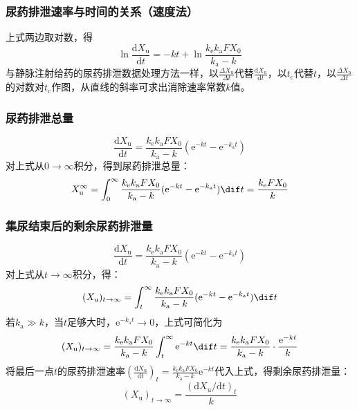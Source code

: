 \documentclass[dvipsnames, svgnames, x11names]{beamer}
\begin{document}
\begin{frame}
    \frametitle{尿药排泄速率与时间的关系（速度法）}
    上式两边取对数，得
    \[
        \ln \frac{\mathrm{d}X_\mathrm{u}}{\mathrm{d}t}=-kt + \ln \frac{k_\mathrm{e}k_\mathrm{a}FX_0}{k_\mathrm{a}-k}
    \]
    与静脉注射给药的尿药排泄数据处理方法一样，以$\frac{\Delta X_{\mathrm{u}}}{\Delta t}$代替$\frac{\mathrm{d}X_\mathrm{u}}{\mathrm{d}t}$，以$t_\mathrm{c}$代替$t$，以$\frac{\Delta X_{\mathrm{u}}}{\Delta t}$的对数对$t_\mathrm{c}$作图，从直线的斜率可求出消除速率常数$k$值。
\end{frame}


\begin{frame}
    \frametitle{尿药排泄总量}
    \[
        \frac{\mathrm{d}X_\mathrm{u}}{\mathrm{d}t}=\frac{k_\mathrm{e}k_\mathrm{a}FX_0}{k_\mathrm{a}-k}(\mathrm{e}^{-kt}-\mathrm{e}^{-k_\mathrm{a}t})
    \]
    对上式从$0 \to \infty$积分，得到尿药排泄总量：
    \[
        X_\mathrm{u}^\infty = \int_0^\infty \frac{k_\mathrm{e}k_\mathrm{a}FX_0}{k_\mathrm{a}-k}(\mathrm{e}^{-kt}-\mathrm{e}^{-k_\mathrm{a}t}) \dif t = \frac{k_\mathrm{e}FX_0}{k}
    \]
\end{frame}


\begin{frame}
    \frametitle{集尿结束后的剩余尿药排泄量}
    \[
        \frac{\mathrm{d}X_\mathrm{u}}{\mathrm{d}t}=\frac{k_\mathrm{e}k_\mathrm{a}FX_0}{k_\mathrm{a}-k}(\mathrm{e}^{-kt}-\mathrm{e}^{-k_\mathrm{a}t})
    \]
    对上式从$t \to \infty$积分，得：
    \[
        (X_\mathrm{u})_{t \to \infty} = \int_t^\infty \frac{k_\mathrm{e}k_\mathrm{a}FX_0}{k_\mathrm{a}-k}(\mathrm{e}^{-kt}-\mathrm{e}^{-k_\mathrm{a}t}) \dif t
    \]
    若$k_\mathrm{a}\gg k$，当$t$足够大时，$\mathrm{e}^{-k_\mathrm{a}t} \to 0$，上式可简化为
    \[
        (X_\mathrm{u})_{t \to \infty} = \frac{k_\mathrm{e}k_\mathrm{a}FX_0}{k_\mathrm{a}-k}\int_t^\infty \mathrm{e}^{-kt} \dif t = \frac{k_\mathrm{e}k_\mathrm{a}FX_0}{k_\mathrm{a}-k}\cdot \frac{\mathrm{e}^{-kt}}{k}
    \]
    将最后一点$t$的尿药排泄速率$(\frac{\mathrm{d}X_\mathrm{u}}{\mathrm{d}t})_t=\frac{k_\mathrm{e}k_\mathrm{a}FX_0}{k_\mathrm{a}-k}\mathrm{e}^{-kt}$代入上式，得剩余尿药排泄量：
    \[
        (X_\mathrm{u})_{t \to \infty} = \frac{(\mathrm{d}X_\mathrm{u}/\mathrm{d}t)_t}{k}
    \]
\end{frame}
\end{document}
